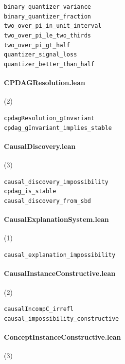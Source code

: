 {\footnotesize
\texttt{binary\_quantizer\_variance}\\
\texttt{binary\_quantizer\_fraction}\\
\texttt{two\_over\_pi\_in\_unit\_interval}\\
\texttt{two\_over\_pi\_le\_two\_thirds}\\
\texttt{two\_over\_pi\_gt\_half}\\
\texttt{quantizer\_signal\_loss}\\
\texttt{quantizer\_better\_than\_half}\\
}

\paragraph{CPDAGResolution.lean} (2)

{\footnotesize
\texttt{cpdagResolution\_gInvariant}\\
\texttt{cpdag\_gInvariant\_implies\_stable}\\
}

\paragraph{CausalDiscovery.lean} (3)

{\footnotesize
\texttt{causal\_discovery\_impossibility}\\
\texttt{cpdag\_is\_stable}\\
\texttt{causal\_discovery\_from\_sbd}\\
}

\paragraph{CausalExplanationSystem.lean} (1)

{\footnotesize
\texttt{causal\_explanation\_impossibility}\\
}

\paragraph{CausalInstanceConstructive.lean} (2)

{\footnotesize
\texttt{causalIncompC\_irrefl}\\
\texttt{causal\_impossibility\_constructive}\\
}

\paragraph{ConceptInstanceConstructive.lean} (3)

